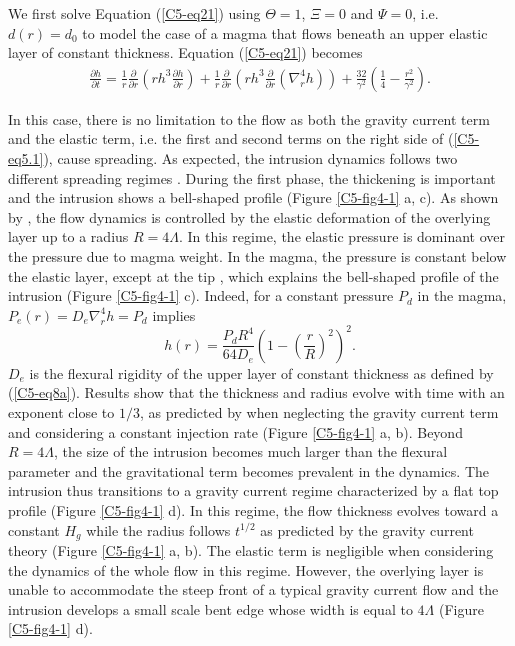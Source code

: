 We first solve Equation  (\ref{C5-eq21}) using $\Theta=1$, $\Xi=0$ and
$\Psi=0$,  i.e. $d(r)=d_0$  to model  the case  of a  magma that
flows beneath an  upper elastic layer of  constant thickness. Equation
(\ref{C5-eq21}) becomes
\begin{eqnarray}
  \frac{\partial h}{\partial t}=\frac{1}{r} \frac{\partial}{\partial r}\left (rh^{3} \frac{\partial h}{\partial r} \right)+ \frac{1}{r}\frac{\partial}{\partial r}\left ( rh^{3} \frac{\partial}{\partial r}\left ( \nabla^{4}_{r}h \right )\right)+\frac{32}{\gamma^{2}} \left(\frac{1}{4}-\frac{r^{2}}{\gamma^{2}}\right).
  \label{C5-eq5.1}
\end{eqnarray}

In this case, there  is no limitation to the flow  as both the gravity
current term and the elastic term,  i.e. the first and second terms on
the right side of (\ref{C5-eq5.1}),  cause spreading. As expected, the
intrusion   dynamics   follows   two   different   spreading   regimes
\citep{Michaut:2011kg,Michaut:2013dr,Bunger:2011cb}.  During the first
phase,  the  thickening  is  important   and  the  intrusion  shows  a
bell-shaped  profile  (Figure  \ref{C5-fig4-1}  a, c).   As  shown  by
\citet{Michaut:2011kg}, the flow dynamics is controlled by the elastic
deformation of  the overlying  layer up to  a radius  $R=4\Lambda$. In
this regime, the elastic pressure is dominant over the pressure due to
magma weight. In the magma, the pressure is constant below the elastic
layer, except  at the tip  \citep{Bunger:2011cb,Michaut:2011kg}, which
explains   the   bell-shaped   profile  of   the   intrusion   (Figure
\ref{C5-fig4-1}  c). Indeed,  for  a constant  pressure  $P_d$ in  the
magma, $P_e(r)=D_e\nabla_r^4h=P_d$ implies
\begin{equation}
  h(r)=\frac{P_{d} R^{4}}{64D_e}\left(1-\left(\frac{r}{R}\right)^2\right)^2.
  \label{C5-eq4-1}
\end{equation}
$D_e$ is the flexural rigidity of  the upper layer of constant thickness
as defined  by (\ref{C5-eq8a}).  Results  show that the  thickness and
radius evolve with time with an  exponent close to $1/3$, as predicted
by \citet{Michaut:2011kg} when neglecting the gravity current term and
considering  a  constant  injection rate  (Figure  \ref{C5-fig4-1}  a,
b). Beyond $R=4\Lambda$, the size of the intrusion becomes much larger
than  the  flexural  parameter  and  the  gravitational  term  becomes
prevalent in the dynamics. The intrusion thus transitions to a gravity
current   regime  characterized   by  a   flat  top   profile  (Figure
\ref{C5-fig4-1} d).  In this regime, the flow thickness evolves toward
a constant  $H_g$ while the  radius follows $t^{1/2}$ as  predicted by
the    gravity    current   theory    \citep{Huppert:1982a}    (Figure
\ref{C5-fig4-1} a, b). The elastic term is negligible when considering
the dynamics of the whole flow in this regime.  However, the overlying
layer is  unable to accommodate the  steep front of a  typical gravity
current flow \citep{Huppert:1982a} and  the intrusion develops a small
scale  bent   edge  whose  width   is  equal  to   $4\Lambda$  (Figure
\ref{C5-fig4-1} d).
		
